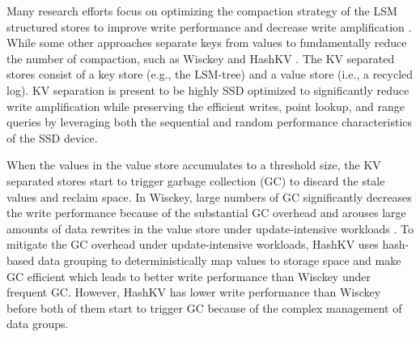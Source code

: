 \documentclass[sigconf]{acmart}
\begin{document}
Many research efforts focus on optimizing the compaction strategy of the LSM structured stores to improve write performance \cite{HyperLevelDB,bLSM,PCP,cLSM,CM} and decrease write amplification \cite{LSMtrie,skiptree,LWCtree,TRIAD}. While some other approaches separate keys from values to fundamentally reduce the number of compaction, such as Wisckey \cite{Wisckey} and HashKV \cite{HashKV}. The KV separated stores consist of a key store (e.g., the LSM-tree) and a value store (i.e., a recycled log). KV separation is present to be highly SSD optimized to significantly reduce write amplification while preserving the efficient writes, point lookup, and range queries by leveraging both the sequential and random performance characteristics of the SSD device.


When the values in the value store accumulates to a threshold size, the KV separated stores start to trigger garbage collection (GC) to discard the stale values and reclaim space. In Wisckey, large numbers of GC significantly decreases the write performance because of the substantial GC overhead \cite{Wisckey} and arouses large amounts of data rewrites in the value store under update-intensive workloads \cite{HashKV}. To mitigate the GC overhead under update-intensive workloads, HashKV uses hash-based data grouping to deterministically map values to storage space and make GC efficient which leads to better write performance than Wisckey under frequent GC. However, HashKV has lower write performance than Wisckey before both of them start to trigger GC because of the complex management of data groups.
\end{document}
